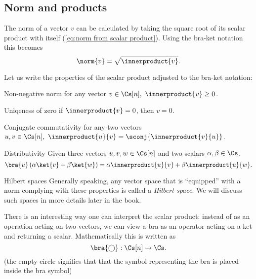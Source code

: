 \subsection{Norm and products}
The norm of a vector $v$ can be calculated by taking the square root of its scalar product with itself (\autoref{eq:norm from scalar product}). Using the bra-ket notation this becomes
\begin{equation}
	\norm{v} = \sqrt{\innerproduct{v}}.
	\label{eq:norm_braket}
\end{equation}

Let us write the properties of the scalar product adjusted to the bra-ket notation:
\begin{descitemize}
	\item[Non-negative norm] for any vector $v\in\Cs[n],\ \innerproduct{v}\geq0$.
	\item[Uniqeness of zero] if $\innerproduct{v}=0$, then $v=0$.
	\item[Conjugate commutativity] for any two vectors $u,v\in\Cs[n],\ \innerproduct{u}{v}=\sconj{\innerproduct{v}{u}}$.
	\item[Distributivity] Given three vectors $u,v,w\in\Cs[n]$ and two scalars $\alpha,\beta\in\Cs$,
		\[
			\bra{u} \left( \alpha\ket{v}+\beta\ket{w} \right) = \alpha\innerproduct{u}{v} + \beta\innerproduct{u}{w}.
		\]
\end{descitemize}

\begin{note}{Hilbert spaces}
 Generally speaking, any vector space that is ``equipped'' with a norm complying with these properties is called a \emph{Hilbert space}. We will discuss such spaces in more details later in the book.
\end{note}

There is an interesting way one can interpret the scalar product: instead of as an operation acting on two vectors, we can view a bra as an operator acting on a ket and returning a scalar. Mathematically this is written as
\begin{equation}
	\bra{\bigcirc}: \Cs[n]\to\Cs.
	\label{eq:bra_as_operator}
\end{equation}
(the empty circle signifies that that the symbol representing the bra is placed inside the bra symbol)



